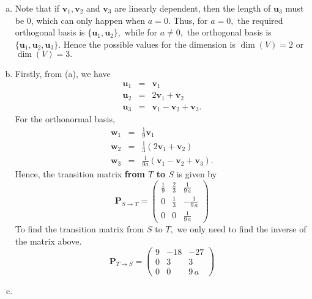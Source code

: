 \documentclass{article}
\newcommand{\matr}[1]{\mathbf{#1}}
\begin{document}
\begin{enumerate}[(a)]
    \item Note that if $\matr{v}_1,\matr{v}_2$ and $\matr{v}_3$ are linearly dependent, then the length of $\matr{u}_3$ must be 0, which can only happen when $a=0.$ Thus, for $a=0,$ the required orthogonal basis is $\{\matr{u}_1,\matr{u}_2\},$ while for $a\neq0,$ the orthogonal basis is $\{\matr{u}_1,\matr{u}_2,\matr{u}_3\}.$ Hence the possible values for the dimension is  $\dim(V)=2$ or $\dim(V)=3.$
    \item Firstly, from (a), we have \begin{eqnarray*}
    \matr{u}_1&=&\matr{v}_1\\
    \matr{u}_2&=&2\matr{v}_1+\matr{v}_2\\
    \matr{u}_3&=&\matr{v}_1-\matr{v}_2+\matr{v}_3.
    \end{eqnarray*}
    For the orthonormal basis,
    \begin{eqnarray*}
    \matr{w}_1&=&\frac{1}{9}\matr{v}_1\\
    \matr{w}_2&=&\frac{1}{3}(2\matr{v}_1+\matr{v}_2)\\
    \matr{w}_3&=&\frac{1}{9a}(\matr{v}_1-\matr{v}_2+\matr{v}_3).
    \end{eqnarray*}
    Hence, the transition matrix \textbf{from $T$ to $S$} is given by 
    \begin{equation*}
        \matr P_{S \to T} = \left(\begin{array}{rrr}
        \frac{1}{9} & \frac{2}{3} & \frac{1}{9 \, a} \\
        0 & \frac{1}{3} & -\frac{1}{9 \, a} \\
        0 & 0 & \frac{1}{9 \, a}
        \end{array}\right)
    \end{equation*}
    To find the transition matrix from $S$ to $T,$ we only need to find the inverse of the matrix above. 
    \begin{equation*}
        \matr P_{T \to S} = \left(\begin{array}{rrr}
        9 & -18 & -27 \\
        0 & 3 & 3 \\
        0 & 0 & 9 \, a
        \end{array}\right)
    \end{equation*}
    \item 

\end{enumerate}
\end{document}
